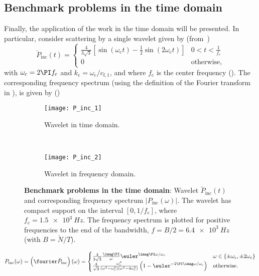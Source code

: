 \subsection{Benchmark problems in the time domain}
Finally, the application of the work in the time domain will be presented. In particular, consider scattering by a single wavelet given by (from~\cite[p. 633]{Jensen2011coa})
\begin{equation}\label{Eq1:Pb_inc}
	\breve{P}_{\mathrm{inc}}(t) = \begin{cases} \frac{4}{3\sqrt{3}} \left[\sin(\omega_{\mathrm{c}} t)-\frac12 \sin\left(2\omega_{\mathrm{c}} t\right)\right] & 0 < t < \frac{1}{f_{\mathrm{c}}}\\
	0 & \text{otherwise},\end{cases}
\end{equation}
with $\omega_{\mathrm{c}} = 2\PI f_{\mathrm{c}}$ and $k_{\mathrm{c}} = \omega_{\mathrm{c}}/c_{\mathrm{f},1}$, and where $f_{\mathrm{c}}$ is the center frequency  (). The corresponding frequency spectrum (using the definition of the Fourier transform in ), is given by ()
\begin{figure}
	\centering
	\begin{subfigure}[t]{0.48\textwidth}
		\centering
		\texttt{[image: P\_inc\_1]}
		\caption{Wavelet in time domain.}
		\label{Fig1:Pb_inc}
	\end{subfigure}
	~
	\begin{subfigure}[t]{0.48\textwidth}
		\centering
		\texttt{[image: P\_inc\_2]}
		\caption{Wavelet in frequency domain.}
		\label{Fig1:P_inc}
	\end{subfigure}
	\caption{\textbf{Benchmark problems in the time domain}: Wavelet $\breve{P}_{\mathrm{inc}}(t)$ and corresponding frequency spectrum $|P_{\mathrm{inc}}(\omega)|$. The wavelet has compact support on the interval $[0,1/f_{\mathrm{c}}]$, where $f_{\mathrm{c}}=\SI{1.5e3}{Hz}$. The frequency spectrum is plotted for positive frequencies to the end of the bandwidth, $f=B/2=\SI{6.4e3}{Hz}$ (with $B=\check{N}/T$).}
\end{figure}
\begin{equation}
	P_{\mathrm{inc}}(\omega) = \left(\fourier\breve{P}_{\mathrm{inc}}\right)(\omega) = \begin{cases}
		\frac{4}{3\sqrt{3}}\frac{\imag\PI}{\omega}\euler^{\imag\PI\omega/\omega_{\mathrm{c}}} & \omega \in\{\pm\omega_{\mathrm{c}},\pm 2\omega_{\mathrm{c}}\}\\
		\frac{4}{\sqrt{3}}\frac{\omega_{\mathrm{c}}^3}{\left(\omega^2-\omega_{\mathrm{c}}^2\right)\left(\omega^2-4\omega_{\mathrm{c}}^2\right)}\left(1-\euler^{-2\PI\imag\omega/\omega_{\mathrm{c}}}\right) & \text{otherwise.}
		\end{cases}
\end{equation}
